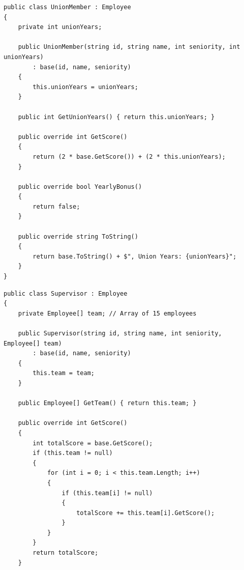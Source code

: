 \documentclass[14pt]{extarticle}
\begin{document}
\clearpage

\begin{boxSolution}
{\small
\begin{english}
\begin{verbatim}
public class UnionMember : Employee
{
    private int unionYears;

    public UnionMember(string id, string name, int seniority, int unionYears)
        : base(id, name, seniority)
    {
        this.unionYears = unionYears;
    }

    public int GetUnionYears() { return this.unionYears; }

    public override int GetScore()
    {
        return (2 * base.GetScore()) + (2 * this.unionYears);
    }

    public override bool YearlyBonus()
    {
        return false;
    }

    public override string ToString()
    {
        return base.ToString() + $", Union Years: {unionYears}";
    }
}
\end{verbatim}
\end{english}
}
\end{boxSolution}

\clearpage

\begin{boxSolution}
{\small
\begin{english}
\begin{verbatim}
public class Supervisor : Employee
{
    private Employee[] team; // Array of 15 employees

    public Supervisor(string id, string name, int seniority, Employee[] team)
        : base(id, name, seniority)
    {
        this.team = team;
    }

    public Employee[] GetTeam() { return this.team; }

    public override int GetScore()
    {
        int totalScore = base.GetScore();
        if (this.team != null)
        {
            for (int i = 0; i < this.team.Length; i++)
            {
                if (this.team[i] != null)
                {
                    totalScore += this.team[i].GetScore();
                }
            }
        }
        return totalScore;
    }
\end{verbatim}
\end{english}
}
\end{boxSolution}
\end{document}
